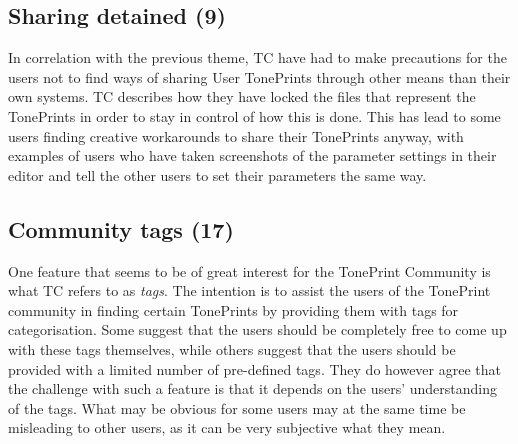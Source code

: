 \subsection*{Sharing detained (9)} 
\label{App:ThemeDetainSharing}
In correlation with the previous theme, TC have had to make precautions for the users not to find ways of sharing User TonePrints through other means than their own systems. TC describes how they have locked the files that represent the TonePrints in order to stay in control of how this is done. This has lead to some users finding creative workarounds to share their TonePrints anyway, with examples of users who have taken screenshots of the parameter settings in their editor and tell the other users to set their parameters the same way.

\subsection*{Community tags (17)} 
\label{App:ThemeCommunityTags}
One feature that seems to be of great interest for the TonePrint Community is what TC refers to as \textit{tags}. The intention is to assist the users of the TonePrint community in finding certain TonePrints by providing them with tags for categorisation. Some suggest that the users should be completely free to come up with these tags themselves, while others suggest that the users should be provided with a limited number of pre-defined tags. They do however agree that the challenge with such a feature is that it depends on the users' understanding of the tags. What may be obvious for some users may at the same time be misleading to other users, as it can be very subjective what they mean.

